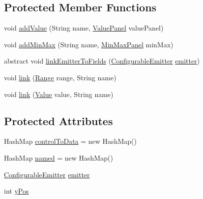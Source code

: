 \subsection*{Protected Member Functions}
\begin{DoxyCompactItemize}
\item 
void \mbox{\hyperlink{classorg_1_1newdawn_1_1slick_1_1tools_1_1peditor_1_1_control_panel_af298d1803e4450ed4ffe735500bb7c60}{add\+Value}} (String name, \mbox{\hyperlink{classorg_1_1newdawn_1_1slick_1_1tools_1_1peditor_1_1_value_panel}{Value\+Panel}} value\+Panel)
\item 
void \mbox{\hyperlink{classorg_1_1newdawn_1_1slick_1_1tools_1_1peditor_1_1_control_panel_aae097ab8bc9bd722af51818b15bcc823}{add\+Min\+Max}} (String name, \mbox{\hyperlink{classorg_1_1newdawn_1_1slick_1_1tools_1_1peditor_1_1_min_max_panel}{Min\+Max\+Panel}} min\+Max)
\item 
abstract void \mbox{\hyperlink{classorg_1_1newdawn_1_1slick_1_1tools_1_1peditor_1_1_control_panel_a55fa468548caadc265ea28c5f3214a20}{link\+Emitter\+To\+Fields}} (\mbox{\hyperlink{classorg_1_1newdawn_1_1slick_1_1particles_1_1_configurable_emitter}{Configurable\+Emitter}} \mbox{\hyperlink{classorg_1_1newdawn_1_1slick_1_1tools_1_1peditor_1_1_control_panel_aaa170169fa574cb6b271f782afcd2517}{emitter}})
\item 
void \mbox{\hyperlink{classorg_1_1newdawn_1_1slick_1_1tools_1_1peditor_1_1_control_panel_a0cd8f0c59ddca29c48029fcc41c0bbde}{link}} (\mbox{\hyperlink{classorg_1_1newdawn_1_1slick_1_1particles_1_1_configurable_emitter_1_1_range}{Range}} range, String name)
\item 
void \mbox{\hyperlink{classorg_1_1newdawn_1_1slick_1_1tools_1_1peditor_1_1_control_panel_a7cd3eff641c2166052877f30525488a5}{link}} (\mbox{\hyperlink{interfaceorg_1_1newdawn_1_1slick_1_1particles_1_1_configurable_emitter_1_1_value}{Value}} value, String name)
\end{DoxyCompactItemize}
\subsection*{Protected Attributes}
\begin{DoxyCompactItemize}
\item 
Hash\+Map \mbox{\hyperlink{classorg_1_1newdawn_1_1slick_1_1tools_1_1peditor_1_1_control_panel_a7316bd7b85c2e289dbafe9b65e33a474}{control\+To\+Data}} = new Hash\+Map()
\item 
Hash\+Map \mbox{\hyperlink{classorg_1_1newdawn_1_1slick_1_1tools_1_1peditor_1_1_control_panel_a27108a3c115a462302ebfa67d895bcaa}{named}} = new Hash\+Map()
\item 
\mbox{\hyperlink{classorg_1_1newdawn_1_1slick_1_1particles_1_1_configurable_emitter}{Configurable\+Emitter}} \mbox{\hyperlink{classorg_1_1newdawn_1_1slick_1_1tools_1_1peditor_1_1_control_panel_aaa170169fa574cb6b271f782afcd2517}{emitter}}
\item 
int \mbox{\hyperlink{classorg_1_1newdawn_1_1slick_1_1tools_1_1peditor_1_1_control_panel_a3d5996be7856b645ae7a1288ce688623}{y\+Pos}}
\end{DoxyCompactItemize}
